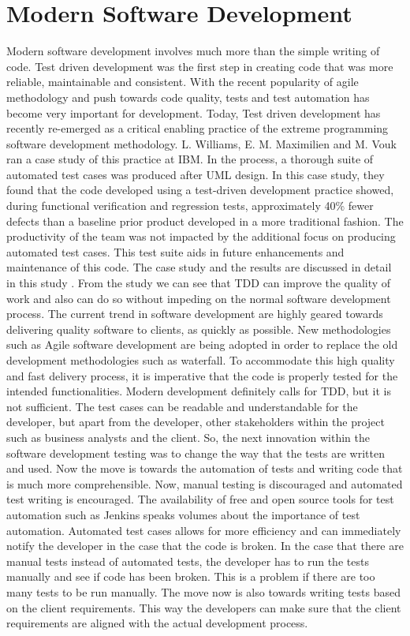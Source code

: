 \documentclass[conference, onecolumn, a4, 12pt]{IEEEtran}
\begin{document}
\section{Modern Software Development}
Modern software development involves much more than the simple writing of code. Test driven development was the first step in creating code that was more reliable, maintainable and consistent. With the recent popularity of agile methodology and push towards code quality, tests and test automation has become very important for development. Today, Test driven development has recently re-emerged as a critical enabling practice of the extreme programming software development methodology. L. Williams, E. M. Maximilien and M. Vouk ran a case study of this practice at IBM. In the process, a thorough suite of automated test cases was produced after UML design. In this case study, they found that the code developed using a test-driven development practice showed, during functional verification and regression tests, approximately 40\% fewer defects than a baseline prior product developed in a more traditional fashion. The productivity of the team was not impacted by the additional focus on producing automated test cases. This test suite aids in future enhancements and maintenance of this code. The case study and the results are discussed in detail in this study \cite{b4}. From the study we can see that TDD can improve the quality of work and also can do so without impeding on the normal software development process. The current trend in software development are highly geared towards delivering quality software to clients, as quickly as possible. New methodologies such as Agile software development are being adopted in order to replace the old development methodologies such as waterfall. To accommodate this high quality and fast delivery process, it is imperative that the code is properly tested for the intended functionalities.\newline
Modern development definitely calls for TDD, but it is not sufficient. The test cases can be readable and understandable for the developer, but apart from the developer, other stakeholders within the project such as business analysts and the client. So, the next innovation within the software development testing was to change the way that the tests are written and used.\newline
Now the move is towards the automation of tests and writing code that is much more comprehensible. Now, manual testing is discouraged and automated test writing is encouraged. The availability of free and open source tools for test automation such as Jenkins speaks volumes about the importance of test automation. Automated test cases allows for more efficiency and can immediately notify the developer in the case that the code is broken. In the case that there are manual tests instead of automated tests, the developer has to run the tests manually and see if code has been broken. This is a problem if there are too many tests to be run manually. The move now is also towards writing tests based on the client requirements. This way  the developers can make sure that the client requirements are aligned with the actual development process.\newline
\end{document}
